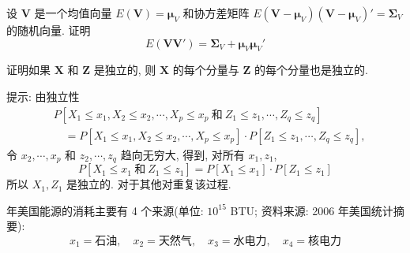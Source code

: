 \quad 设 $\mathbf{V}$ 是一个均值向量 $E(\mathbf{V})=\boldsymbol{\mu}_V$ 和协方差矩阵 $E(\mathbf{V}-\boldsymbol{\mu}_V)(\mathbf{V}-\boldsymbol{\mu}_V)'=\boldsymbol{\Sigma}_V$ 的随机向量. 证明
\[
E(\mathbf{V}\mathbf{V}')=\boldsymbol{\Sigma}_V+\boldsymbol{\mu}_V\boldsymbol{\mu}_V'
\]

\quad 证明如果 $\mathbf{X}$ 和 $\mathbf{Z}$ 是独立的, 则 $\mathbf{X}$ 的每个分量与 $\mathbf{Z}$ 的每个分量也是独立的.

提示: 由独立性
\begin{align*}
&P[X_1\le x_1, X_2\le x_2,\cdots, X_p\le x_p\ \text{和}\ Z_1\le z_1,\cdots, Z_q\le z_q]\\
&\quad=P[X_1\le x_1, X_2\le x_2,\cdots, X_p\le x_p]\cdot P[Z_1\le z_1,\cdots, Z_q\le z_q],
\end{align*}
令 $x_2,\cdots,x_p$ 和 $z_2,\cdots,z_q$ 趋向无穷大, 得到, 对所有 $x_1, z_1$,
\[
P[X_1\le x_1\ \text{和}\ Z_1\le z_1]=P[X_1\le x_1]\cdot P[Z_1\le z_1]
\]
所以 $X_1, Z_1$ 是独立的. 对于其他对重复该过程.

 年美国能源的消耗主要有 4 个来源(单位: $10^{15}$ BTU; 资料来源: 2006 年美国统计摘要):
\[
x_1=\text{石油}, \quad x_2=\text{天然气}, \quad x_3=\text{水电力}, \quad x_4=\text{核电力}
\]
